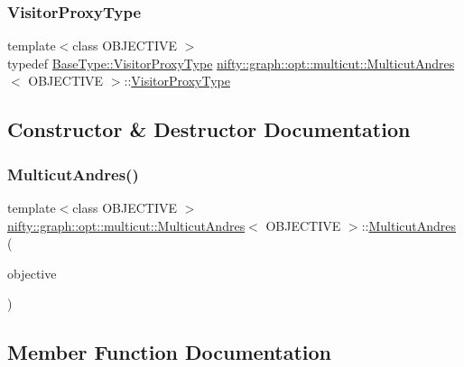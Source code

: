\subsubsection{\texorpdfstring{Visitor\+Proxy\+Type}{VisitorProxyType}}
{\footnotesize\ttfamily template$<$class O\+B\+J\+E\+C\+T\+I\+VE $>$ \\
typedef \hyperlink{classnifty_1_1graph_1_1opt_1_1common_1_1SolverBase_ad209b469b3bc9fc0fc14e9fed4d09075}{Base\+Type\+::\+Visitor\+Proxy\+Type} \hyperlink{classnifty_1_1graph_1_1opt_1_1multicut_1_1MulticutAndres}{nifty\+::graph\+::opt\+::multicut\+::\+Multicut\+Andres}$<$ O\+B\+J\+E\+C\+T\+I\+VE $>$\+::\hyperlink{classnifty_1_1graph_1_1opt_1_1multicut_1_1MulticutAndres_a898fcb16a25facde8ba763b27a331bda}{Visitor\+Proxy\+Type}}



\subsection{Constructor \& Destructor Documentation}
\mbox{\label{classnifty_1_1graph_1_1opt_1_1multicut_1_1MulticutAndres_a0995daba89398a444065df5227737ac6}} 
\subsubsection{\texorpdfstring{Multicut\+Andres()}{MulticutAndres()}}
{\footnotesize\ttfamily template$<$class O\+B\+J\+E\+C\+T\+I\+VE $>$ \\
\hyperlink{classnifty_1_1graph_1_1opt_1_1multicut_1_1MulticutAndres}{nifty\+::graph\+::opt\+::multicut\+::\+Multicut\+Andres}$<$ O\+B\+J\+E\+C\+T\+I\+VE $>$\+::\hyperlink{classnifty_1_1graph_1_1opt_1_1multicut_1_1MulticutAndres}{Multicut\+Andres} (\begin{DoxyParamCaption}\item[{const \hyperlink{classnifty_1_1graph_1_1opt_1_1multicut_1_1MulticutAndres_aed60c2f4ed9c6c6b97e8b513d7a48e86}{Objective\+Type} \&}]{objective }\end{DoxyParamCaption})}



\subsection{Member Function Documentation}
\mbox{\label{classnifty_1_1graph_1_1opt_1_1multicut_1_1MulticutAndres_ad49ef5b1f23c054abb4521445871b9b4}} 
